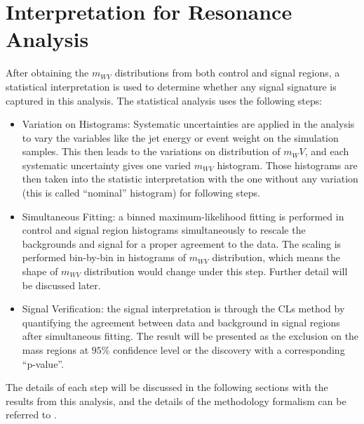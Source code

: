 \chapter{Interpretation for Resonance Analysis}
\label{Ch:resonance_stat}
After obtaining the $m_{WV}$ distributions from both control and signal regions, a statistical interpretation is used to determine whether any signal signature is captured in this analysis. The statistical analysis uses the following steps:

\begin{itemize}
	\item{Variation on Histograms}: Systematic uncertainties are applied in the analysis to vary the variables like the jet energy or event weight on the simulation samples. This then leads to the variations on distribution of $m_WV$, and each systematic uncertainty gives one varied $m_{WV}$ histogram. Those histograms are then taken into the statistic interpretation with the one without any variation (this is called ``nominal'' histogram) for following steps. 

	\item{Simultaneous Fitting}: a binned maximum-likelihood fitting is performed in control and signal region histograms simultaneously to rescale the backgrounds and signal for a proper agreement to the data. The scaling is performed bin-by-bin in histograms of $m_{WV}$ distribution, which means the shape of $m_{WV}$ distribution would change under this step. Further detail will be discussed later.
	
	\item{Signal Verification}: the signal interpretation is through the CLs method by quantifying the agreement between data and background in signal regions after simultaneous fitting. The result will be presented as the exclusion on the mass regions at $95\%$ confidence level or the discovery with a corresponding ``p-value''.
\end{itemize}
The details of each step will be discussed in the following sections with the results from this analysis, and the details of the methodology formalism can be referred to \cite{StatisticsData}.
